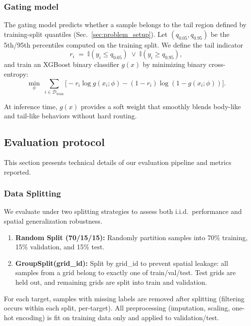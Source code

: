 \documentclass[11pt,conference,onecolumn]{IEEEtran}
\begin{document}
\subsubsection{Gating model}
The gating model predicts whether a sample belongs to the tail region defined by training-split quantiles (Sec.~\ref{sec:problem_setup}). Let $(q_{0.05},q_{0.95})$ be the 5th/95th percentiles computed on the training split. We define the tail indicator
\begin{equation}
    r_i \;=\; \mathbb{I}\!\left(y_i \le q_{0.05}\right)\;\lor\;\mathbb{I}\!\left(y_i \ge q_{0.95}\right),
\end{equation}
and train an XGBoost binary classifier $g(x)$ by minimizing binary cross-entropy:
\begin{equation}
    \min_{\phi}\;\sum_{i\in\mathcal{D}_{\mathrm{train}}}
    \Big[-r_i\log g(x_i;\phi) - (1-r_i)\log(1-g(x_i;\phi))\Big].
\end{equation}

At inference time, $g(x)$ provides a soft weight that smoothly blends body-like and tail-like behaviors without hard routing.

\subsection{Evaluation protocol}

This section presents technical details of our evaluation pipeline and metrics reported.

\label{sec:eval_protocol}

\subsubsection{Data Splitting}
\label{sec:data_splitting}

We evaluate under two splitting strategies to assess both i.i.d.\ performance and spatial generalization robustness.
\begin{enumerate}
    \item \textbf{Random Split (70/15/15):} Randomly partition samples into 70\% training, 15\% validation, and 15\% test.
    \item \textbf{GroupSplit(grid\_id):} Split by grid\_id to prevent spatial leakage: all samples from a grid belong to exactly one of train/val/test. Test grids are held out, and remaining grids are split into train and validation.
\end{enumerate}

\textbf{} For each target, samples with missing labels are removed after splitting (filtering occurs within each split, per-target). All preprocessing (imputation, scaling, one-hot encoding) is fit on training data only and applied to validation/test.
\end{document}
